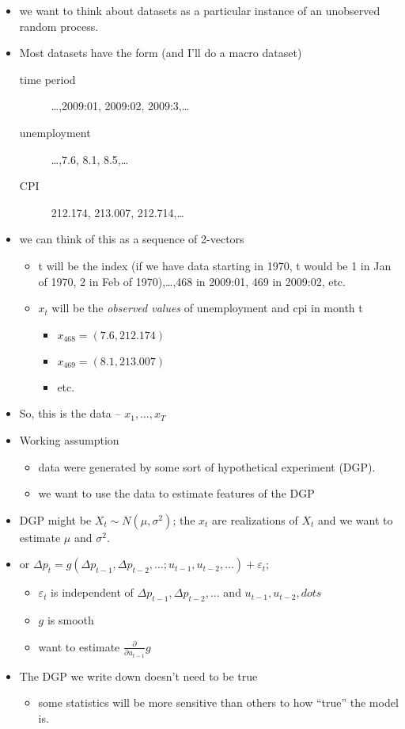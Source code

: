 \begin{itemize}
\item we want to think about datasets as a particular instance of an
      unobserved random process.
\item Most datasets have the form (and I'll do a macro dataset)
\begin{description}
\item[time period] \ldots{},2009:01, 2009:02, 2009:3,\ldots{}
\item[unemployment] \ldots{},7.6, 8.1, 8.5,\ldots{}
\item[CPI] 212.174, 213.007, 212.714,\ldots{}
\end{description}
\item we can think of this as a sequence of 2-vectors
\begin{itemize}
\item t will be the index (if we have data starting in 1970, t would
        be 1 in Jan of 1970, 2 in Feb of 1970),\ldots{},468 in 2009:01, 469
        in 2009:02, etc.
\item $x_t$ will be the \emph{observed values} of unemployment and cpi in
        month t
\begin{itemize}
\item $x_{468} = (7.6, 212.174)$
\item $x_{469} = (8.1, 213.007)$
\item etc.
\end{itemize}
\end{itemize}
\item So, this is the data -- $x_1,\dots,x_T$
\item Working assumption
\begin{itemize}
\item data were generated by some sort of hypothetical experiment (DGP).
\item we want to use the data to estimate features of the DGP
\end{itemize}
\item DGP might be $X_t \sim N(\mu, \sigma^2)$; the $x_t$ are
      realizations of $X_t$ and we want to estimate $\mu$ and
      $\sigma^2$.
\item or $\Delta p_t = g(\Delta p_{t-1}, \Delta p_{t-2}, \dots; u_{t-1}, u_{t-2}, \dots) + \varepsilon_t$;
\begin{itemize}
\item $\varepsilon_t$ is independent of $\Delta p_{t-1}, \Delta p_{t-2}, \dots$ and $u_{t-1}, u_{t-2}, dots$
\item $g$ is smooth
\item want to estimate $\frac{\partial}{\partial u_{t-1}} g$
\end{itemize}
\item The DGP we write down doesn't need to be true
\begin{itemize}
\item some statistics will be more sensitive than others to how ``true'' the model is.
\end{itemize}
\end{itemize}

